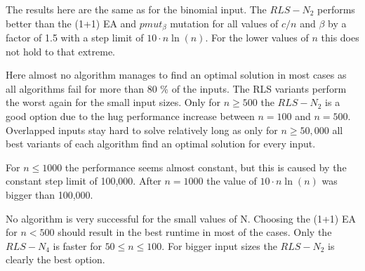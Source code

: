 The results here are the same as for the binomial input. The $RLS-N_2$ performs better than the (1+1) EA and $pmut_\beta$ mutation for all values of $c/n$ and $\beta$ by a factor of 1.5 with a step limit of $10 \cdot n \ln(n)$. For the lower values of $n$ this does not hold to that extreme.



Here almost no algorithm manages to find an optimal solution in most cases as all algorithms fail for more than 80 \% of the inputs.
The RLS variants perform the worst again for the small input sizes.
Only for $n\ge500$ the $RLS-N_{2}$ is a good option due to the hug performance increase between $n=100$ and $n=500$.
Overlapped inputs stay hard to solve relatively long as only for $n\ge50,000$ all best variants of each algorithm find an optimal solution for every input.



For $n\le1000$ the performance seems almost constant, but this is caused by the constant step limit of 100,000.
After $n=1000$ the value of $10 \cdot n \ln(n)$ was bigger than 100,000.



No algorithm is very successful for the small values of N.
Choosing the (1+1) EA for $n<500$ should result in the best runtime in most of the cases.
Only the $RLS-N_4$ is faster for $50\le n \le 100$.
For bigger input sizes the $RLS-N_2$ is clearly the best option.